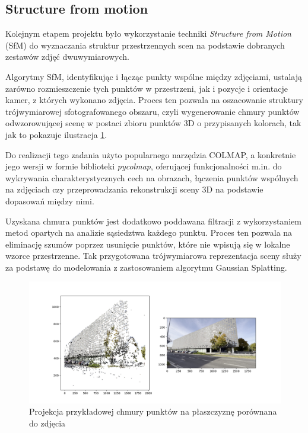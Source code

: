 \subsection{Structure from motion}
Kolejnym etapem projektu było wykorzystanie techniki \textit{Structure from Motion} (SfM) do wyznaczania
struktur przestrzennych scen na podstawie dobranych zestawów zdjęć dwuwymiarowych. 

Algorytmy SfM, identyfikując i łącząc 
punkty wspólne między zdjęciami, ustalają zarówno rozmieszczenie tych punktów w przestrzeni, jak i pozycje 
i orientacje kamer, z których wykonano zdjęcia. Proces ten pozwala na oszacowanie struktury trójwymiarowej
sfotografowanego obszaru, czyli wygenerowanie chmury punktów odwzorowującej scenę w postaci 
zbioru punktów 3D o przypisanych kolorach, tak jak to pokazuje ilustracja \ref{fig:sfm_ex}. 

Do realizacji tego zadania użyto popularnego narzędzia COLMAP\cite{schoenberger2016mvs}\cite{Schonberger_2016_CVPR}, a konkretnie jego wersji w formie biblioteki 
\textit{pycolmap}\cite{pycolmap}, oferującej funkcjonalności m.in. do wykrywania charakterystycznych cech na obrazach, 
łączenia punktów wspólnych na zdjęciach czy przeprowadzania rekonstrukcji sceny 3D na podstawie dopasowań 
między nimi.

Uzyskana chmura punktów jest dodatkowo poddawana filtracji z wykorzystaniem metod opartych na analizie 
sąsiedztwa każdego punktu. Proces ten pozwala na eliminację szumów poprzez usunięcie punktów, które nie 
wpisują się w lokalne wzorce przestrzenne. Tak przygotowana trójwymiarowa reprezentacja sceny służy za 
podstawę do modelowania z zastosowaniem algorytmu Gaussian Splatting.

\begin{figure}[!ht]
    \centering
    \includegraphics[width=0.9\linewidth]{images/sfm.png}
    \caption{Projekcja przykładowej chmury punktów na płaszczyznę porównana do zdjęcia}
    \label{fig:sfm_ex}
\end{figure}